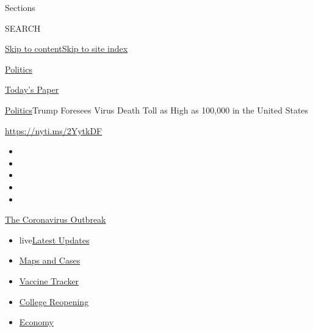 Sections

SEARCH

\protect\hyperlink{site-content}{Skip to
content}\protect\hyperlink{site-index}{Skip to site index}

\href{https://www.nytimes3xbfgragh.onion/section/politics}{Politics}

\href{https://myaccount.nytimes3xbfgragh.onion/auth/login?response_type=cookie\&client_id=vi}{}

\href{https://www.nytimes3xbfgragh.onion/section/todayspaper}{Today's
Paper}

\href{/section/politics}{Politics}\textbar{}Trump Foresees Virus Death
Toll as High as 100,000 in the United States

\url{https://nyti.ms/2YytkDF}

\begin{itemize}
\item
\item
\item
\item
\item
\end{itemize}

\href{https://www.nytimes3xbfgragh.onion/news-event/coronavirus?action=click\&pgtype=Article\&state=default\&region=TOP_BANNER\&context=storylines_menu}{The
Coronavirus Outbreak}

\begin{itemize}
\tightlist
\item
  live\href{https://www.nytimes3xbfgragh.onion/2020/08/04/world/coronavirus-cases.html?action=click\&pgtype=Article\&state=default\&region=TOP_BANNER\&context=storylines_menu}{Latest
  Updates}
\item
  \href{https://www.nytimes3xbfgragh.onion/interactive/2020/us/coronavirus-us-cases.html?action=click\&pgtype=Article\&state=default\&region=TOP_BANNER\&context=storylines_menu}{Maps
  and Cases}
\item
  \href{https://www.nytimes3xbfgragh.onion/interactive/2020/science/coronavirus-vaccine-tracker.html?action=click\&pgtype=Article\&state=default\&region=TOP_BANNER\&context=storylines_menu}{Vaccine
  Tracker}
\item
  \href{https://www.nytimes3xbfgragh.onion/2020/08/02/us/covid-college-reopening.html?action=click\&pgtype=Article\&state=default\&region=TOP_BANNER\&context=storylines_menu}{College
  Reopening}
\item
  \href{https://www.nytimes3xbfgragh.onion/live/2020/08/04/business/stock-market-today-coronavirus?action=click\&pgtype=Article\&state=default\&region=TOP_BANNER\&context=storylines_menu}{Economy}
\end{itemize}

